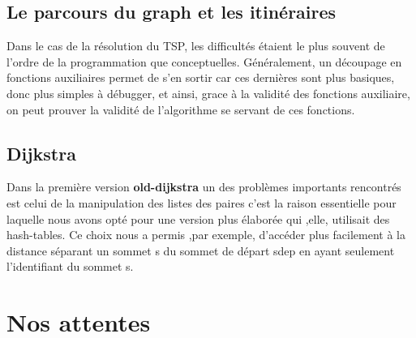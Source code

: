 \documentclass[french]{article}
\begin{document}
\subsection{Le parcours du graph et les itinéraires}
Dans le cas de la résolution du TSP, les difficultés étaient le plus souvent de l'ordre de la programmation que conceptuelles. Généralement, un découpage en fonctions auxiliaires permet de s'en sortir car ces dernières sont plus basiques, donc plus simples à débugger, et ainsi, grace à la validité des fonctions auxiliaire, on peut prouver la validité de l'algorithme se servant de ces fonctions.

\subsection{Dijkstra}
Dans la première version \textbf{old-dijkstra} un des problèmes importants rencontrés est celui de la manipulation des listes des paires c'est la raison essentielle pour laquelle nous avons opté pour une version plus élaborée qui ,elle, utilisait des hash-tables. Ce choix nous a permis ,par exemple, d'accéder plus facilement à la distance séparant un sommet s du sommet de départ sdep en ayant seulement l'identifiant du sommet s. 

\newpage
\section{Nos attentes}
\end{document}
